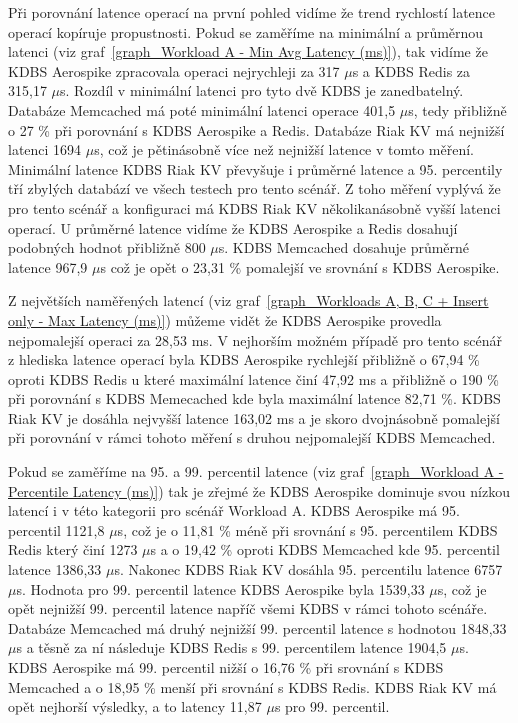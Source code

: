 \documentclass[czech,master,dept460,male,csharp,cpdeclaration]{diploma}
\begin{document}
	Při porovnání latence operací na první pohled vidíme že trend rychlostí latence operací kopíruje propustnosti. Pokud se zaměříme na minimální a průměrnou latenci (viz graf~\ref{graph_Workload A - Min Avg Latency (ms)}), tak vidíme že KDBS Aerospike zpracovala operaci nejrychleji za 317 $\mu$s a KDBS Redis za 315,17 $\mu$s. Rozdíl v minimální latenci pro tyto dvě KDBS je zanedbatelný. Databáze Memcached má poté minimální latenci operace 401,5 $\mu$s, tedy přibližně o 27 \% při porovnání s KDBS Aerospike a Redis. Databáze Riak KV má nejnižší latenci 1694 $\mu$s, což je pětinásobně více než nejnižší latence v tomto měření. Minimální latence KDBS Riak KV převyšuje i průměrné latence a 95. percentily tří zbylých databází ve všech testech pro tento scénář. Z toho měření vyplývá že pro tento scénář a konfiguraci má KDBS Riak KV několikanásobně vyšší latenci operací. U průměrné latence vidíme že KDBS Aerospike a Redis dosahují podobných hodnot přibližně 800 $\mu$s. KDBS Memcached dosahuje průměrné latence 967,9 $\mu$s což je opět o 23,31 \% pomalejší ve srovnání s KDBS Aerospike.
	
	Z největších naměřených latencí (viz graf~\ref{graph_Workloads A, B, C + Insert only - Max Latency (ms)}) můžeme vidět že KDBS Aerospike provedla nejpomalejší operaci za 28,53 ms. V nejhorším možném případě pro tento scénář z hlediska latence operací byla KDBS Aerospike rychlejší přibližně o 67,94 \% oproti KDBS Redis u které maximální latence činí 47,92 ms a přibližně o 190 \% při porovnání s KDBS Memecached kde byla maximální latence 82,71 \%. KDBS Riak KV je dosáhla nejvyšší latence 163,02 ms a je skoro dvojnásobně pomalejší při porovnání v rámci tohoto měření s druhou nejpomalejší KDBS Memcached.
	
	Pokud se zaměříme na 95. a 99. percentil latence (viz graf~\ref{graph_Workload A - Percentile Latency (ms)}) tak je zřejmé že KDBS Aerospike dominuje svou nízkou latencí i v této kategorii pro scénář Workload A. KDBS Aerospike má 95. percentil 1121,8 $\mu$s, což je o 11,81 \% méně při srovnání s 95. percentilem KDBS Redis který činí 1273 $\mu$s a o 19,42 \% oproti KDBS Memcached kde 95. percentil latence 1386,33 $\mu$s. Nakonec KDBS Riak KV dosáhla 95. percentilu latence 6757 $\mu$s. Hodnota pro 99. percentil latence KDBS Aerospike byla 1539,33 $\mu$s, což je opět nejnižší 99. percentil latence napříč všemi KDBS v rámci tohoto scénáře. Databáze Memcached má druhý nejnižší 99. percentil latence s hodnotou 1848,33 $\mu$s a těsně za ní následuje KDBS Redis s 99. percentilem latence 1904,5 $\mu$s. KDBS Aerospike má 99. percentil nižší o 16,76 \% při srovnání s KDBS Memcached a o 18,95 \% menší při srovnání s KDBS Redis. KDBS Riak KV má opět nejhorší výsledky, a to latency 11,87 $\mu$s pro 99. percentil.
	
\end{document}
